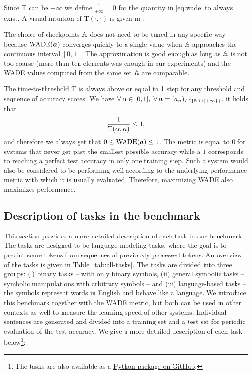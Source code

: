 Since $\text{T}$ can be $+\infty$ we define
$\frac{1}{+\infty} = 0$ for the quantity in \eqref{eq:wade} to always exist. A visual
intuition of $\text{T}(\cdot, \cdot)$ is given in .


The choice of checkpoints ${\mathbb{A}}$ does not need to be tuned in any specific way
because $\text{WADE}({\bm{a}})$ converges quickly to a single value when ${\mathbb{A}}$
approaches the continuous interval $[0, 1]$. The approximation is good enough as
long as ${\mathbb{A}}$ is not too coarse (more than ten elements was enough in our
experiments) and the WADE values computed from the same set ${\mathbb{A}}$ are
comparable.

The time-to-threshold $\text{T}$ is always above or equal to 1 step for any threshold and sequence of accuracy scores.
We have
$\forall\: \alpha \in [0, 1],\;  \forall\: {\bm{a}} = ({a}_{n})_{I \subset \{\mathbb{N}\; \cup \{+\infty\} \}}$, it holds that
\begin{equation}
  \label{eq:wade-0-1}
\frac{1}{\text{T}(\alpha, {\bm{a}})} \leq 1,
\end{equation}
and therefore we always get that $0 \leq \text{WADE}({\bm{a}}) \leq 1$. The metric is equal to $0$
for systems that never get past the smallest possible accuracy while a $1$
corresponds to reaching a perfect test accuracy in only one training step. Such
a system would also be considered to be performing well according to the
underlying performance metric with which it is usually evaluated. Therefore,
maximizing WADE also maximizes performance.


\subsection{Description of tasks in the benchmark\label{sec:descr-tasks-benchm}}

This section provides a more detailed description of each task in our benchmark.
The tasks are designed to be language modeling tasks, where the goal is to
predict some tokens from sequences of previously processed tokens. An overview
of the tasks is given in Table~\ref{tab:all-tasks}. The tasks are divided into three
groups: (i) binary tasks -- with only binary symbols, (ii) general symbolic tasks
-- symbolic manipulations with arbitrary symbols -- and (iii) language-based tasks
-- the symbols represent words in English and behave like a language. We introduce
this benchmark together with the WADE metric, but both can be used in other
contexts as well to measure the learning speed of other systems. Individual
sentences are generated and divided into a training set and a test set for
periodic evaluation of the test accuracy. We give a more detailed description of
each task below\footnote{The tasks are also available as a
  \href{https://github.com/hugcis/incremental_tasks}{Python package on GitHub}.}:

